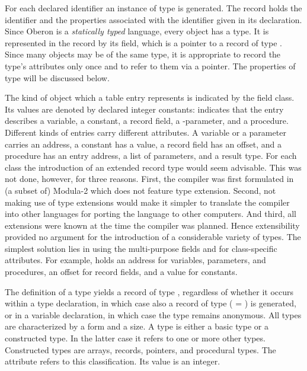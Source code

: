 For each declared identifier an instance of type  is generated. The record holds the identifier and the properties associated with the identifier given in its declaration. Since Oberon is a \emph{statically typed} language, every object has a type. It is represented in the record by its  field, which is a pointer to a record of type . Since many objects may be of the same type, it is appropriate to record the type's attributes only once and to refer to them via a pointer. The properties of type  will be discussed below.

The kind of object which a table entry represents is indicated by the field class. Its values are denoted by declared integer constants:  indicates that the entry describes a variable,  a constant,  a record field,  a -parameter, and  a procedure. Different kinds of entries carry different attributes. A variable or a parameter carries an address, a constant has a value, a record field has an offset, and a procedure has an entry address, a list of parameters, and a result type. For each class the introduction of an extended record type would seem advisable. This was not done, however, for three reasons. First, the compiler was first formulated in (a subset of) Modula-2 which does not feature type extension. Second, not making use of type extensions would make it simpler to translate the compiler into other languages for porting the language to other computers. And third, all extensions were known at the time the compiler was planned. Hence extensibility provided no argument for the introduction of a considerable variety of types. The simplest solution lies in using the multi-purpose fields  and  for class-specific attributes. For example,  holds an address for variables, parameters, and procedures, an offset for record fields, and a value for constants.

The definition of a type yields a record of type , regardless of whether it occurs within a type declaration, in which case also a record of type  ( = ) is generated, or in a variable declaration, in which case the type remains anonymous. All types are characterized by a form and a size. A type is either a basic type or a constructed type. In the latter case it refers to one or more other types. Constructed types are arrays, records, pointers, and procedural types. The attribute  refers to this classification. Its value is an integer.

